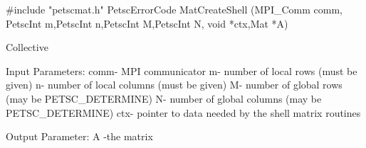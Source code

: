 #include "petscmat.h"
PetscErrorCode  MatCreateShell
   (MPI_Comm comm,
    PetscInt m,PetscInt n,PetscInt M,PetscInt N,
    void *ctx,Mat *A)

Collective

Input Parameters:
comm- MPI communicator
m- number of local rows (must be given)
n- number of local columns (must be given)
M- number of global rows (may be PETSC_DETERMINE)
N- number of global columns (may be PETSC_DETERMINE)
ctx- pointer to data needed by the shell matrix routines

Output Parameter:
A -the matrix
